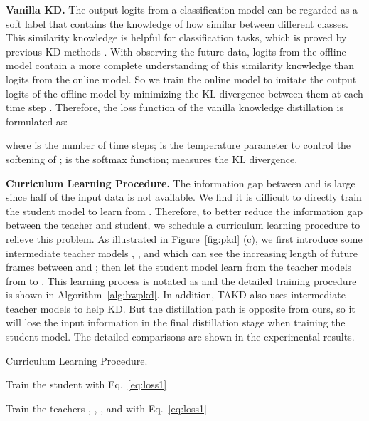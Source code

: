 \documentclass[final]{cvpr}
\begin{document}
\vspace{4pt}

\noindent \textbf{Vanilla KD.} 
The output logits from a classification model can be regarded as a soft label that contains the knowledge of how similar between different classes. This similarity knowledge is helpful for classification tasks, which is proved by previous KD methods \cite{hinton2015distilling,ahn2019variational,hegde2020variational}. With observing the future data, logits from the offline model contain a more complete understanding of this similarity knowledge than logits from the online model. So we train the online model to imitate the output logits of the offline model by minimizing the KL divergence between them at each time step . Therefore, the loss function of the vanilla knowledge distillation is formulated as:  

where  is the number of time steps;  is the temperature parameter \cite{hinton2015distilling} to control the softening of ;  is the softmax function;  measures the KL divergence.

\vspace{4pt}

\noindent \textbf{Curriculum Learning Procedure.} 
The information gap between  and  is large since half of the input data is not available. We find it is difficult to directly train the student model  to learn from . Therefore, to better reduce the information gap between the teacher and student, we schedule a curriculum learning procedure to relieve this problem. As illustrated in Figure~\ref{fig:pkd} (c), we first introduce some intermediate teacher models , , and  which can see the increasing length of future frames between  and ; then let the student model  learn from the teacher models from  to . This learning process is notated as  and the detailed training procedure is shown in Algorithm~\ref{alg:bwpkd}. In addition, TAKD \cite{mirzadeh2020improved} also uses intermediate teacher models to help KD. But the distillation path is opposite from ours, so it will lose the input information in the final distillation stage when training the student model. The detailed comparisons are shown in the experimental results.




\begin{algorithm}[t]
\caption{Curriculum Learning Procedure.}
\label{alg:bwpkd}
\LinesNumbered
{}
Train the student  with Eq.~\eqref{eq:loss1}

Train the teachers , , , and  with Eq.~\eqref{eq:loss1} 



\end{algorithm}
\end{document}
